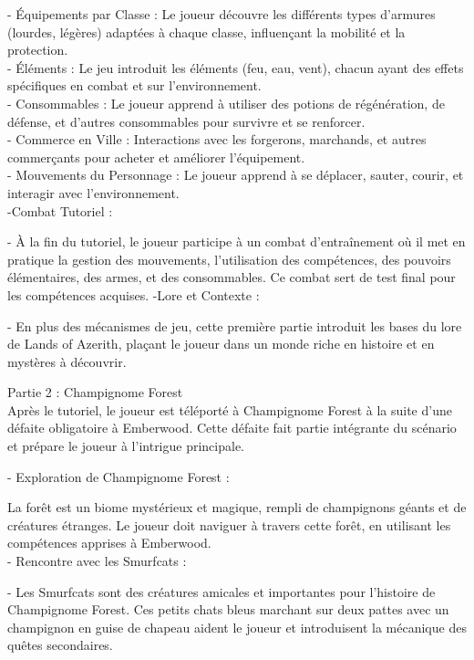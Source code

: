 - Équipements par Classe : Le joueur découvre les différents types d'armures (lourdes, légères) adaptées à chaque classe, influençant la mobilité et la protection.
\\

- Éléments : Le jeu introduit les éléments (feu, eau, vent), chacun ayant des effets spécifiques en combat et sur l'environnement.
\\

- Consommables : Le joueur apprend à utiliser des potions de régénération, de défense, et d'autres consommables pour survivre et se renforcer.
\\

- Commerce en Ville : Interactions avec les forgerons, marchands, et autres commerçants pour acheter et améliorer l'équipement.
\\

-  Mouvements du Personnage : Le joueur apprend à se déplacer, sauter, courir, et interagir avec l'environnement.
\\

-Combat Tutoriel :

- À la fin du tutoriel, le joueur participe à un combat d'entraînement où il met en pratique la gestion des mouvements, l'utilisation des compétences, des pouvoirs élémentaires, des armes, et des consommables.
Ce combat sert de test final pour les compétences acquises.
-Lore et Contexte :

- En plus des mécanismes de jeu, cette première partie introduit les bases du lore de Lands of Azerith, plaçant le joueur dans un monde riche en histoire et en mystères à découvrir.



Partie 2 : Champignome Forest
\\


Après le tutoriel, le joueur est téléporté à Champignome Forest à la suite d'une défaite obligatoire à Emberwood.
Cette défaite fait partie intégrante du scénario et prépare le joueur à l'intrigue principale.



- Exploration de Champignome Forest :

La forêt est un biome mystérieux et magique, rempli de champignons géants et de créatures étranges.
Le joueur doit naviguer à travers cette forêt, en utilisant les compétences apprises à Emberwood.
\\


- Rencontre avec les Smurfcats :

- Les Smurfcats sont des créatures amicales et importantes pour l'histoire de Champignome Forest.
Ces petits chats bleus marchant sur deux pattes avec un champignon en guise de chapeau aident le joueur et introduisent la mécanique des quêtes secondaires.

